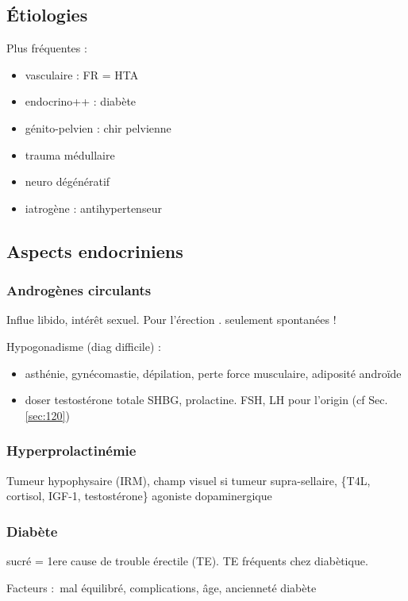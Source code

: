 \documentclass[11pt]{article}
\begin{document}
\subsection{Étiologies}
\label{sec:org53c8036}
Plus fréquentes :
\begin{itemize}
\item vasculaire : FR = HTA
\item endocrino++ : diabète
\item génito-pelvien : chir pelvienne
\item trauma médullaire
\item neuro dégénératif
\item iatrogène : antihypertenseur
\end{itemize}

\subsection{Aspects endocriniens}
\label{sec:orgf1ba992}
\subsubsection{Androgènes circulants}
\label{sec:orge094f9c}
Influe libido, intérêt sexuel. Pour l'érection . seulement spontanées !

Hypogonadisme (diag difficile) : 
\begin{itemize}
\item asthénie, gynécomastie, dépilation, perte force musculaire, adiposité androïde
\item doser testostérone totale \textpm{} SHBG, prolactine. FSH, LH pour l'origin (cf
Sec. \ref{sec:120})
\end{itemize}

\subsubsection{Hyperprolactinémie}
\label{sec:org6fd216d}
Tumeur hypophysaire (IRM), champ visuel si tumeur
supra-sellaire, \{T4L, cortisol, IGF-1, testostérone\}
\thus agoniste dopaminergique

\subsubsection{Diabète}
\label{sec:org633ec84}
sucré = 1ere cause de trouble érectile (TE). TE fréquents chez diabètique. 

Facteurs : mal équilibré, complications, âge, ancienneté diabète
\end{document}
